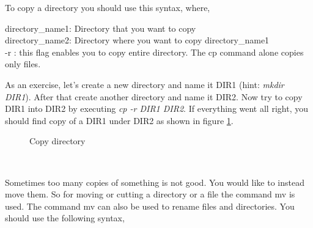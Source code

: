 \par \noindent To copy a directory  you should use this syntax,  where, \\

\par \noindent directory\_name1: Directory that you want to copy \\
directory\_name2: Directory where you want to copy directory\_name1 \\
-r :  this flag enables you to copy entire directory. The cp command alone copies only files. \\

\par \noindent As an exercise, let's create a new directory and name it DIR1 (hint:  \textit{mkdir DIR1}). After that create another directory and name it DIR2. Now try to copy DIR1 into DIR2 by executing \textit{cp -r DIR1 DIR2}. If everything went all right, you should find copy of a DIR1 under DIR2 as shown in figure \ref{fig:cp1}. \\

\begin{figure}[h!]	
	\centering
	\caption{Copy directory}	
	\label{fig:cp1}	
\end{figure}

\par \noindent {} \\

\par \noindent Sometimes too many copies of something is not good. You would like to instead move them. So for moving or cutting a directory or a file the command mv is used. The command mv can also be used to rename files and directories. You should use the following syntax, \\

